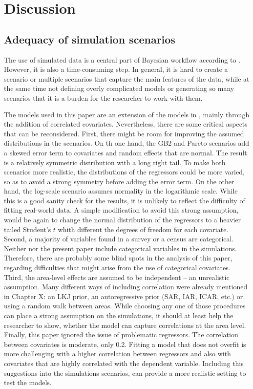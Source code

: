 \chapter{Discussion}

\section{Adequacy of simulation scenarios}

The use of simulated data is a central part of Bayesian workflow according to \cite{gelman_bayesian_2020}.
However, it is also a time-consuming step.
In general, it is hard to create a scenario or multiple scenarios that capture the main features of the data, while at the same time not defining overly complicated models or generating so many scenarios that it is a burden for the researcher to work with them.

The models used in this paper are an extension of the models in \cite{rojas_perilla_data_2020}, mainly through the addition of correlated covariates.
Nevertheless, there are some critical aspects that can be reconsidered.
First, there might be room for improving the assumed distributions in the scenarios.
On th one hand, the GB2 and Pareto scenarios add a skewed error term to covariates and random effects that are normal.
The result is a relatively symmetric distribution with a long right tail.
To make both scenarios more realistic, the distributions of the regressors could be more varied, so as to avoid a strong symmetry before adding the error term.
On the other hand, the log-scale scenario assumes normality in the logarithmic scale.
While this is a good sanity check for the results, it is unlikely to reflect the difficulty of fitting real-world data.
A simple modification to avoid this strong assumption, would be again to change the normal distribution of the regressors to a heavier tailed Student's $t$ whith different the degrees of freedom for each covariate.
Second, a majority of variables found in a survey or a census are categorical.
Neither \cite{rojas_perilla_data_2020} nor the present paper include categorical variables in the simulations.
Therefore, there are probably some blind spots in the analysis of this paper, regarding difficulties that might arise from the use of categorical covariates.
Third, the area-level effects are assumed to be independent – an unrealistic assumption.
Many different ways of including correlation were already mentioned in Chapter X: an LKJ prior, an autoregressive prior (SAR, IAR, ICAR, etc.) or using a random walk between areas.
While choosing any one of those procedures can place a strong assumption on the simulations, it should at least help the researcher to show, whether the model can capture correlations at the area level.
Finally, this paper ignored the issue of problematic regressors.
The correlation between covariates is moderate, only 0.2.
Fitting a model that does not overfit is more challenging with a higher correlation between regressors and also with covariates that are highly correlated with the dependent variable.
Including this suggestions into the simulations scenarios, can provide a more realistic setting to test the models.

